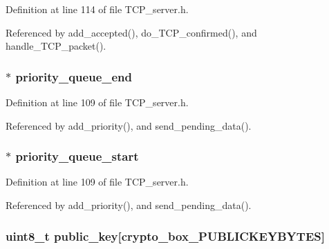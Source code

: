 Definition at line 114 of file T\+C\+P\+\_\+server.\+h.



Referenced by add\+\_\+accepted(), do\+\_\+\+T\+C\+P\+\_\+confirmed(), and handle\+\_\+\+T\+C\+P\+\_\+packet().

\hypertarget{struct_t_c_p___secure___connection_a049dfdaebf54337c3024e077370c62d7}{
\subsubsection[{priority\+\_\+queue\+\_\+end}]{ $\ast$ priority\+\_\+queue\+\_\+end}}\label{struct_t_c_p___secure___connection_a049dfdaebf54337c3024e077370c62d7}


Definition at line 109 of file T\+C\+P\+\_\+server.\+h.



Referenced by add\+\_\+priority(), and send\+\_\+pending\+\_\+data().

\hypertarget{struct_t_c_p___secure___connection_a5e19017835c72dc03d9dfd9a93abeb3c}{
\subsubsection[{priority\+\_\+queue\+\_\+start}]{$\ast$ priority\+\_\+queue\+\_\+start}}\label{struct_t_c_p___secure___connection_a5e19017835c72dc03d9dfd9a93abeb3c}


Definition at line 109 of file T\+C\+P\+\_\+server.\+h.



Referenced by add\+\_\+priority(), and send\+\_\+pending\+\_\+data().

\hypertarget{struct_t_c_p___secure___connection_aaa806bb1136fb3d4b5d8d8970b596ff7}{
\subsubsection[{public\+\_\+key}]{\setlength{\rightskip}{0pt plus 5cm}uint8\+\_\+t public\+\_\+key\mbox{[}crypto\+\_\+box\+\_\+\+P\+U\+B\+L\+I\+C\+K\+E\+Y\+B\+Y\+T\+E\+S\mbox{]}}}\label{struct_t_c_p___secure___connection_aaa806bb1136fb3d4b5d8d8970b596ff7}


